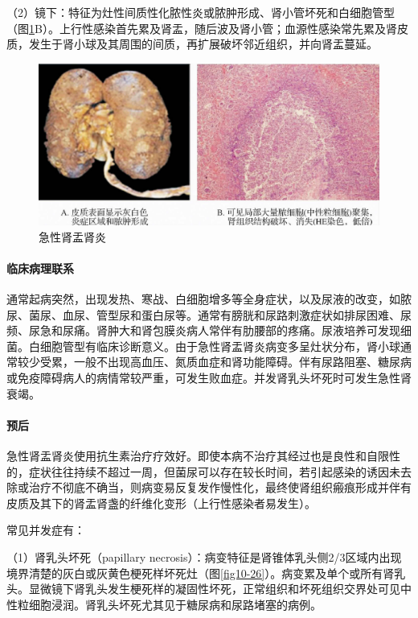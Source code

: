 （2）镜下：特征为灶性间质性化脓性炎或脓肿形成、肾小管坏死和白细胞管型（图\ref{fig10-25}B）。上行性感染首先累及肾盂，随后波及肾小管；血源性感染常先累及肾皮质，发生于肾小球及其周围的间质，再扩展破坏邻近组织，并向肾盂蔓延。

\begin{figure}[!htbp]
 \centering
 \includegraphics{./images/Image00174.jpg}
 \captionsetup{justification=centering}
 \caption{急性肾盂肾炎}
 \label{fig10-25}
  \end{figure} 

\paragraph{临床病理联系}
通常起病突然，出现发热、寒战、白细胞增多等全身症状，以及尿液的改变，如脓尿、菌尿、血尿、管型尿和蛋白尿等。通常有膀胱和尿路刺激症状如排尿困难、尿频、尿急和尿痛。肾肿大和肾包膜炎病人常伴有肋腰部的疼痛。尿液培养可发现细菌。白细胞管型有临床诊断意义。由于急性肾盂肾炎病变多呈灶状分布，肾小球通常较少受累，一般不出现高血压、氮质血症和肾功能障碍。伴有尿路阻塞、糖尿病或免疫障碍病人的病情常较严重，可发生败血症。并发肾乳头坏死时可发生急性肾衰竭。

\paragraph{预后}
急性肾盂肾炎使用抗生素治疗疗效好。即使本病不治疗其经过也是良性和自限性的，症状往往持续不超过一周，但菌尿可以存在较长时间，若引起感染的诱因未去除或治疗不彻底不确当，则病变易反复发作慢性化，最终使肾组织瘢痕形成并伴有皮质及其下的肾盂肾盏的纤维化变形（上行性感染者易发生）。

常见并发症有：

（1）肾乳头坏死（papillary
necrosis）：病变特征是肾锥体乳头侧2/3区域内出现境界清楚的灰白或灰黄色梗死样坏死灶（图\ref{fig10-26}）。病变累及单个或所有肾乳头。显微镜下肾乳头发生梗死样的凝固性坏死，正常组织和坏死组织交界处可见中性粒细胞浸润。肾乳头坏死尤其见于糖尿病和尿路堵塞的病例。


